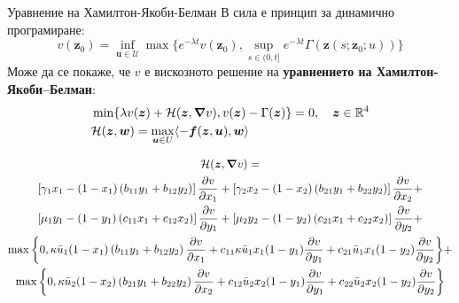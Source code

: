 \begin{frame}[t]{Уравнение на Хамилтон-Якоби-Белман}
  В сила е принцип за динамично програмиране:
  \begin{equation}
    v(\boldsymbol{z}_0) = \inf_{\boldsymbol{u} \in \mathscr{U}} \max\{e^{-\lambda t} v(\boldsymbol{z}_0), \sup_{s \in (0, t]} e^{-\lambda t} \Gamma(\boldsymbol{z}(s; \boldsymbol{z}_0; u))\}
  \end{equation}
  Може да се покаже, че $v$ е вискозното решение на \textbf{уравнението на Хамилтон-Якоби–Белман}:
  \begin{equation}
    \begin{split}
      \label{HJB}
      &\min\{\lambda v(\boldsymbol{z}) + \mathcal{H}(\boldsymbol{z}, \grad{v}), v(\boldsymbol{z}) - \Gamma(\boldsymbol{z}) \} = 0, \quad \boldsymbol{z} \in \mathbb{R}^4 \\
      &\mathcal{H}(\boldsymbol{z}, \boldsymbol{w}) = \max_{\boldsymbol{u} \in U} \langle -\boldsymbol{f}(\boldsymbol{z}, \boldsymbol{u}), \boldsymbol{w} \rangle
    \end{split}
  \end{equation}

  \begin{footnotesize}
    \begin{multline}
      \label{eq:HamiltonianShort}
      \mathcal{H}(\boldsymbol{z}, \grad{v}) = \\
      \left[\gamma_1 x_1 - (1-x_1) \left(b_{11} y_1 + b_{12} y_2\right) \right] \pdv{v}{x_1} +
      \left[\gamma_2 x_2 - (1-x_2) \left(b_{21} y_1 + b_{22} y_2\right) \right] \pdv{v}{x_2} + \\
      \left[\mu_1 y_1 - (1-y_1) \left(c_{11} x_1 + c_{12} x_2\right) \right] \pdv{v}{y_1} +
      \left[\mu_2 y_2 - (1-y_2) \left(c_{21} x_1 + c_{22} x_2\right)\right] \pdv{v}{y_2} + \\
      \max\bigg\{0, \kappa \bar{u}_1 (1-x_1) \left(b_{11} y_1 + b_{12} y_2\right) \pdv{v}{x_1} + c_{11} \kappa \bar{u}_1 x_1 (1-y_1)\pdv{v}{y_1} + c_{21} \bar{u}_1 x_1 (1-y_2) \pdv{v}{y_2}
      \bigg\} + \\
      \max\bigg\{0, \kappa \bar{u}_2 (1-x_2) \left(b_{21} y_1 + b_{22} y_2\right) \pdv{v}{x_2} + c_{12} \bar{u}_2 x_2 (1-y_1)\pdv{v}{y_1} + c_{22}  \bar{u}_2 x_2 (1-y_2)\pdv{v}{y_2} \bigg\}
    \end{multline}
  \end{footnotesize}

\end{frame}

